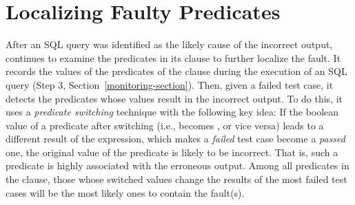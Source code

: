 \section{Localizing Faulty Predicates}

After an SQL query was identified as the likely cause of the
incorrect output, \tool{} continues to examine the predicates in its
 clause to further localize the fault. 
It records the values of the predicates of the  clause
during the execution of an SQL query (Step 3,
Section~\ref{monitoring-section}). Then, given a failed test case, it
detects the predicates whose values result in the incorrect output. To
do this, it uses a \emph{predicate switching} technique with the
following key idea: If the boolean value of a predicate after
switching (i.e.,  becomes , or vice versa)
leads to a different result of the  expression, which
makes a \emph{failed} test case become a \emph{passed} one, the
original value of the predicate is likely to be incorrect. That is,
such a predicate is highly associated with the erroneous output. Among
all predicates in the  clause, those whose switched
values change the results of the most failed test cases will be the
most likely ones to contain the fault(s).



 
